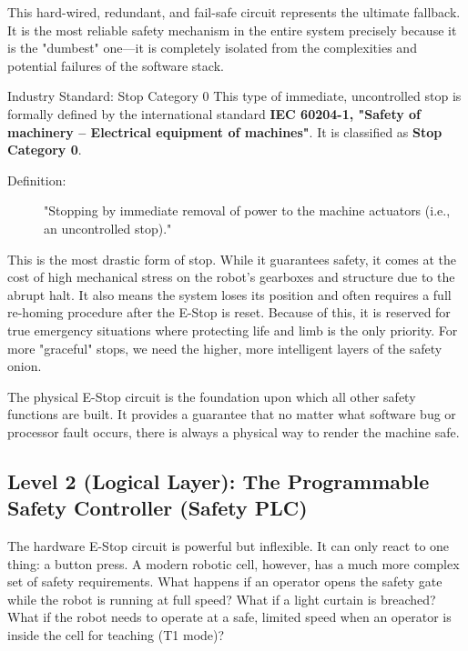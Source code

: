 This hard-wired, redundant, and fail-safe circuit represents the ultimate fallback. It is the most reliable safety mechanism in the entire system precisely because it is the "dumbest" one—it is completely isolated from the complexities and potential failures of the software stack.

\begin{tipbox}{Industry Standard: Stop Category 0}
    This type of immediate, uncontrolled stop is formally defined by the international standard \textbf{IEC 60204-1, "Safety of machinery – Electrical equipment of machines"}. It is classified as \textbf{Stop Category 0}.
    
    \begin{description}
        \item[Definition:] "Stopping by immediate removal of power to the machine actuators (i.e., an uncontrolled stop)."
    \end{description}
    
    This is the most drastic form of stop. While it guarantees safety, it comes at the cost of high mechanical stress on the robot's gearboxes and structure due to the abrupt halt. It also means the system loses its position and often requires a full re-homing procedure after the E-Stop is reset. Because of this, it is reserved for true emergency situations where protecting life and limb is the only priority. For more "graceful" stops, we need the higher, more intelligent layers of the safety onion.
\end{tipbox}

The physical E-Stop circuit is the foundation upon which all other safety functions are built. It provides a guarantee that no matter what software bug or processor fault occurs, there is always a physical way to render the machine safe.




\subsection{Level 2 (Logical Layer): The Programmable Safety Controller (Safety PLC)}
\label{subsec:level2_safety_plc}

The hardware E-Stop circuit is powerful but inflexible. It can only react to one thing: a button press. A modern robotic cell, however, has a much more complex set of safety requirements. What happens if an operator opens the safety gate while the robot is running at full speed? What if a light curtain is breached? What if the robot needs to operate at a safe, limited speed when an operator is inside the cell for teaching (T1 mode)?

